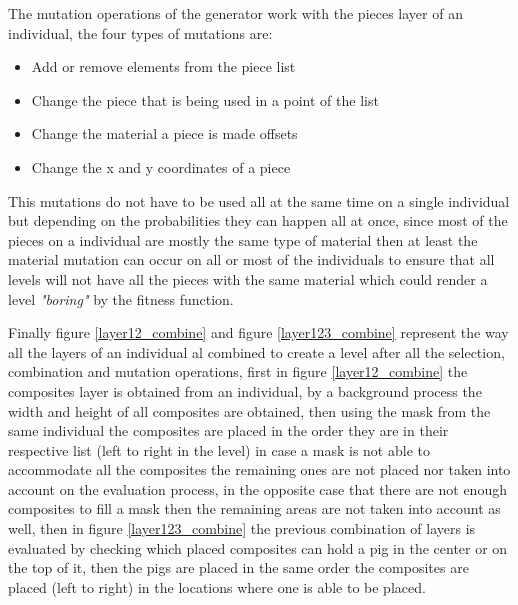 \documentclass[conference]{IEEEtran}
\begin{document}
    The mutation operations of the generator work with the pieces layer of an
    individual, the four types of mutations are:
    
    \begin{itemize}
        \item Add or remove elements from the piece list
        \item Change the piece that is being used in a point of the list
        \item Change the material a piece is made offsets
        \item Change the x and y coordinates of a piece
    \end{itemize}
    
    This mutations do not have to be used all at the same time on a single
    individual but depending on the probabilities they can happen all at once,
    since most of the pieces on a individual are mostly the same type of
    material then at least the material mutation can occur on all or most of
    the individuals to ensure that all levels will not have all the pieces with
    the same material which could render a level \textit{"boring"} by the
    fitness function.
    

    
    Finally figure \ref{layer12_combine} and figure \ref{layer123_combine} represent 
    the way all the layers of an individual al combined to create a level after all 
    the selection, combination and mutation operations, first in figure \ref{layer12_combine}
    the composites layer is obtained from an individual, by a background process the 
    width and height of all composites are obtained, then using the mask from the same 
    individual the composites are placed in the order they are in their respective list 
    (left to right in the level) in case a mask is not able to accommodate all the 
    composites the remaining ones are not placed nor taken into account on the evaluation 
    process, in the opposite case that there are not enough composites to fill a mask 
    then the remaining areas are not taken into account as well, then in figure \ref{layer123_combine} 
    the previous combination of layers is evaluated by checking which placed composites 
    can hold a pig in the center or on the top of it, then the pigs are placed in the 
    same order the composites are placed (left to right) in the locations where one 
    is able to be placed.
    
\end{document}
